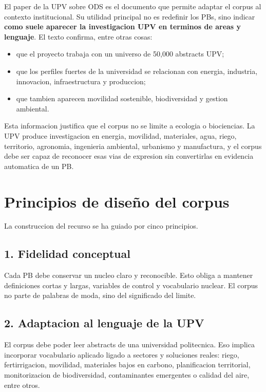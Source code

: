 \documentclass[11pt,a4paper]{article}
\begin{document}
El paper de la UPV sobre ODS es el documento que permite adaptar el corpus al contexto institucional. Su utilidad principal no es redefinir los PBs, sino indicar \textbf{como suele aparecer la investigacion UPV en terminos de areas y lenguaje}. El texto confirma, entre otras cosas:

\begin{itemize}
\item que el proyecto trabaja con un universo de 50{,}000 abstracts UPV;
\item que los perfiles fuertes de la universidad se relacionan con energia, industria, innovacion, infraestructura y produccion;
\item que tambien aparecen movilidad sostenible, biodiversidad y gestion ambiental.
\end{itemize}

Esta informacion justifica que el corpus no se limite a ecologia o biociencias. La UPV produce investigacion en energia, movilidad, materiales, agua, riego, territorio, agronomia, ingenieria ambiental, urbanismo y manufactura, y el corpus debe ser capaz de reconocer esas vias de expresion sin convertirlas en evidencia automatica de un PB.

\section{Principios de dise\~no del corpus}

La construccion del recurso se ha guiado por cinco principios.

\subsection{1. Fidelidad conceptual}

Cada PB debe conservar un nucleo claro y reconocible. Esto obliga a mantener definiciones cortas y largas, variables de control y vocabulario nuclear. El corpus no parte de palabras de moda, sino del significado del limite.

\subsection{2. Adaptacion al lenguaje de la UPV}

El corpus debe poder leer abstracts de una universidad politecnica. Eso implica incorporar vocabulario aplicado ligado a sectores y soluciones reales: riego, fertirrigacion, movilidad, materiales bajos en carbono, planificacion territorial, monitorizacion de biodiversidad, contaminantes emergentes o calidad del aire, entre otros.
\end{document}
